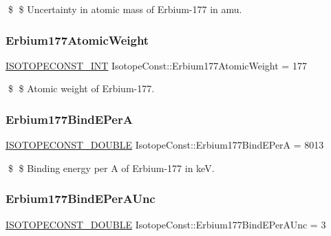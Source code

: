 \$ \$ Uncertainty in atomic mass of Erbium-\/177 in amu. \mbox{\label{group___isotope_const-_erbium-_er177_ga41431407c786783d104d470bad99573b}} 
\subsubsection{\texorpdfstring{Erbium177\+Atomic\+Weight}{Erbium177AtomicWeight}}
{\footnotesize\ttfamily \mbox{\hyperlink{group___isotope_const-_macros_ga5f18360b3e99483a35c32d789e62621c}{I\+S\+O\+T\+O\+P\+E\+C\+O\+N\+S\+T\+\_\+\+I\+NT}} Isotope\+Const\+::\+Erbium177\+Atomic\+Weight = 177}

\$ \$ Atomic weight of Erbium-\/177. \mbox{\label{group___isotope_const-_erbium-_er177_gaaa1c0bd50a3772d1923be9f006e6420d}} 
\subsubsection{\texorpdfstring{Erbium177\+Bind\+E\+PerA}{Erbium177BindEPerA}}
{\footnotesize\ttfamily \mbox{\hyperlink{group___isotope_const-_macros_ga8f45a7272ce02c0b4c65c44636ed719a}{I\+S\+O\+T\+O\+P\+E\+C\+O\+N\+S\+T\+\_\+\+D\+O\+U\+B\+LE}} Isotope\+Const\+::\+Erbium177\+Bind\+E\+PerA = 8013}

\$ \$ Binding energy per A of Erbium-\/177 in keV. \mbox{\label{group___isotope_const-_erbium-_er177_ga15fbdd19144c300b1980acf41b7fb133}} 
\subsubsection{\texorpdfstring{Erbium177\+Bind\+E\+Per\+A\+Unc}{Erbium177BindEPerAUnc}}
{\footnotesize\ttfamily \mbox{\hyperlink{group___isotope_const-_macros_ga8f45a7272ce02c0b4c65c44636ed719a}{I\+S\+O\+T\+O\+P\+E\+C\+O\+N\+S\+T\+\_\+\+D\+O\+U\+B\+LE}} Isotope\+Const\+::\+Erbium177\+Bind\+E\+Per\+A\+Unc = 3}

